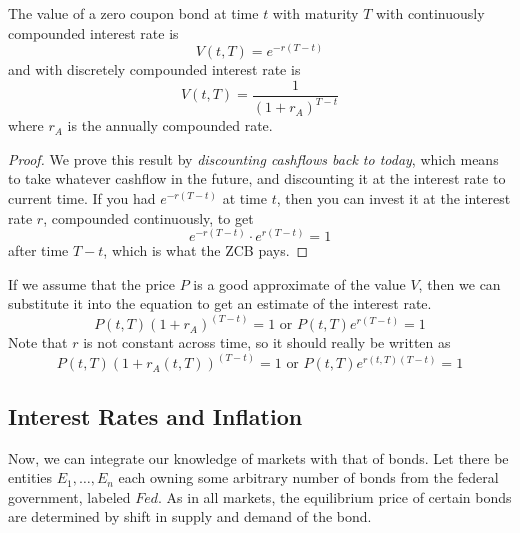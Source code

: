 \documentclass{article}
\begin{document}
    \begin{theorem}
      \label{thm:value-of-zero-coupon-bond}
      The value of a zero coupon bond at time $t$ with maturity $T$ with continuously compounded interest rate is 
      \begin{equation}
        V(t, T) = e^{-r(T-t)}
      \end{equation}
      and with discretely compounded interest rate is 
      \begin{equation}
        V(t, T) = \frac{1}{(1 + r_A)^{T - t}}
      \end{equation}
      where $r_A$ is the annually compounded rate. 
    \end{theorem}
    \begin{proof}
      We prove this result by \textit{discounting cashflows back to today}, which means to take whatever cashflow in the future, and discounting it at the interest rate to current time. If you had $e^{-r (T - t)}$ at time $t$, then you can invest it at the interest rate $r$, compounded continuously, to get 
      \begin{equation}
        e^{- r(T - t)} \cdot e^{r (T - t)} = 1
      \end{equation}
      after time $T - t$, which is what the ZCB pays. 
    \end{proof}

    If we assume that the price $P$ is a good approximate of the value $V$, then we can substitute it into the equation to get an estimate of the interest rate.  
    \begin{equation}
      P(t, T) (1 + r_A)^{(T - t)} = 1 \text{ or } P(t, T) e^{r (T - t)} = 1
    \end{equation}
    Note that $r$ is not constant across time, so it should really be written as 
    \begin{equation}
      P(t, T) (1 + r_A(t, T))^{(T - t)} = 1 \text{ or } P(t, T) e^{r(t, T) (T - t)} = 1
    \end{equation}

  \subsection{Interest Rates and Inflation}

    Now, we can integrate our knowledge of markets with that of bonds. Let there be entities $E_1, \ldots, E_n$ each owning some arbitrary number of bonds from the federal government, labeled $Fed$. As in all markets, the equilibrium price of certain bonds are determined by shift in supply and demand of the bond.
\end{document}
